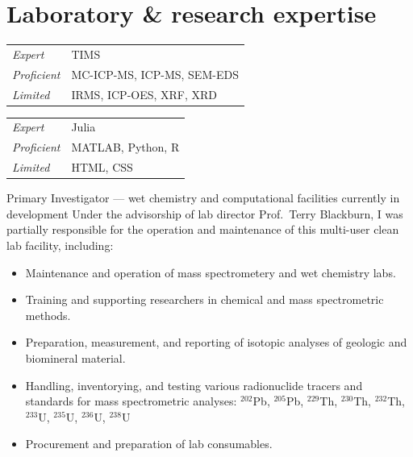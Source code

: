 \section{Laboratory \& research expertise}

\begin{tabular}{ll}
	\itshape Expert & TIMS \\
	\itshape Proficient & MC-ICP-MS, ICP-MS, SEM-EDS \\
	\itshape Limited & IRMS, ICP-OES, XRF, XRD
\end{tabular}

\begin{tabular}{ll}
	\itshape Expert & Julia \\
	\itshape Proficient & MATLAB, Python, R \\
	\itshape Limited & HTML, CSS
\end{tabular}

Primary Investigator --- wet chemistry and computational facilities currently in development
Under the advisorship of lab director Prof.~Terry Blackburn, I was partially responsible for the operation and maintenance of this multi-user clean lab facility, including:
\begin{itemize} 
	\item Maintenance and operation of mass spectrometery and wet chemistry labs.
	\item Training and supporting researchers in chemical and mass spectrometric methods.
	\item Preparation, measurement, and reporting of isotopic analyses of geologic and biomineral material.
	\item Handling, inventorying, and testing various radionuclide tracers and standards for mass spectrometric analyses:  $^{202}$Pb, $^{205}$Pb, $^{229}$Th, $^{230}$Th, $^{232}$Th, $^{233}$U, $^{235}$U, $^{236}$U, $^{238}$U
	\item Procurement and preparation of lab consumables.
\end{itemize}